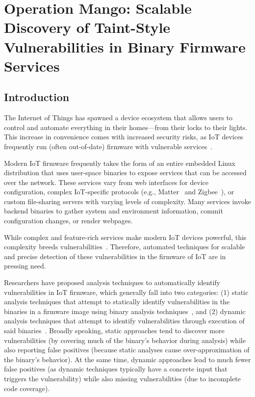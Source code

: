 \chapter{Operation Mango: Scalable Discovery of Taint-Style Vulnerabilities in Binary Firmware Services}
\label{ch:mango}

\section{Introduction}
\label{sec:mango-intro}

The Internet of Things has spawned a device ecosystem that allows users to control and automate everything in their homes---from their locks to their lights.
This increase in convenience comes with increased security risks, as IoT devices frequently run (often out-of-date) firmware with vulnerable services~\cite{kudelski,cybertalk}.

Modern IoT firmware frequently takes the form of an entire embedded Linux distribution that uses user-space binaries to expose services that can be accessed over the network.
These services vary from web interfaces for device configuration, complex IoT-specific protocols (e.g., Matter~\cite{matter} and Zigbee~\cite{zigbee}), or custom file-sharing servers with varying levels of complexity.
Many services invoke backend binaries to gather system and environment information, commit configuration changes, or render webpages.

While complex and feature-rich services make modern IoT devices powerful, this complexity breeds vulnerabilities~\cite{gbhackers,scmagazine}.
Therefore, automated techniques for scalable and precise detection of these vulnerabilities in the firmware of IoT are in pressing need.

Researchers have proposed analysis techniques to automatically identify vulnerabilities in IoT firmware, which generally fall into two categories:
(1) static analysis techniques that attempt to statically identify vulnerabilities in the binaries in a firmware image using binary analysis techniques~\cite{karonte,SaTC},
and (2) dynamic analysis techniques that attempt to identify vulnerabilities through execution of said binaries~\cite{chen2016towards,kim2020firmae,zheng2019firm,zheng2022efficient}.
Broadly speaking, static approaches tend to discover more vulnerabilities (by covering much of the binary's behavior during analysis) while also reporting false positives (because static analyses cause over-approximation of the binary's behavior).
At the same time, dynamic approaches lead to much fewer false positives (as dynamic techniques typically have a concrete input that triggers the vulnerability) while also missing vulnerabilities (due to incomplete code coverage).

